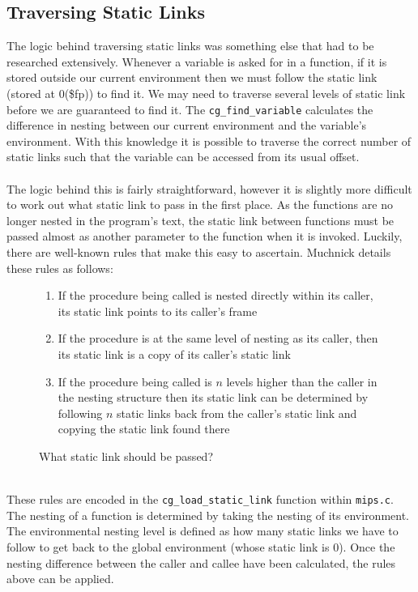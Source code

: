 \subsection{Traversing Static Links}
\label{sec:staticlinks}
The logic behind traversing static links was something else that had to be researched extensively. Whenever a variable is asked for in a function, if it is stored outside our current environment then we must follow the static link (stored at 0(\$fp)) to find it. We may need to traverse several levels of static link before we are guaranteed to find it. The \verb!cg_find_variable! calculates the difference in nesting between our current environment and the variable's environment. With this knowledge it is possible to traverse the correct number of static links such that the variable can be accessed from its usual offset.
\ \\ \ \\
The logic behind this is fairly straightforward, however it is slightly more difficult to work out what static link to pass in the first place. As the functions are no longer nested in the program's text, the static link between functions must be passed almost as another parameter to the function when it is invoked. Luckily, there are well-known rules that make this easy to ascertain. Muchnick details these rules as follows:
\begin{figure}[H]
\begin{enumerate}
	\item If the procedure being called is nested directly within its caller, its static link points to its caller's frame
	\item If the procedure is at the same level of nesting as its caller, then its static link is a copy of its caller's static link
	\item If the procedure being called is $n$ levels higher than the caller in the nesting structure then its static link can be determined by following $n$ static links back from the caller's static link and copying the static link found there
\end{enumerate}
\caption{What static link should be passed?\cite{muchnick1997}}
\end{figure}
\ \\
These rules are encoded in the \verb!cg_load_static_link! function within \verb!mips.c!. The nesting of a function is determined by taking the nesting of its environment. The environmental nesting level is defined as how many static links we have to follow to get back to the global environment (whose static link is 0). Once the nesting difference between the caller and callee have been calculated, the rules above can be applied.

